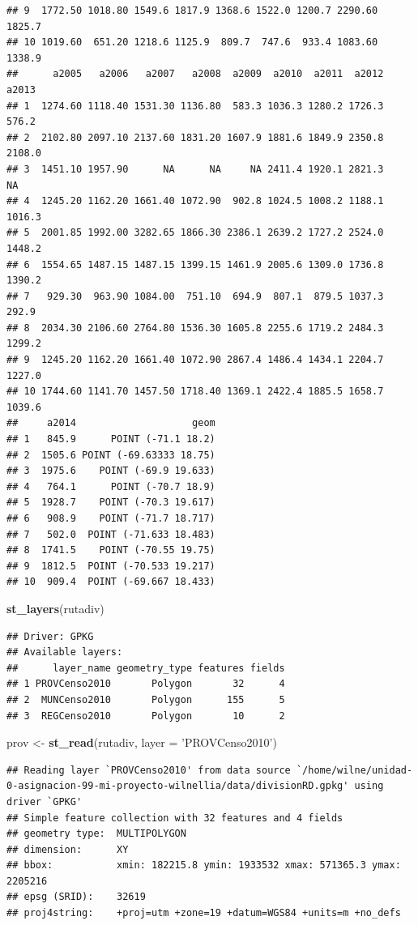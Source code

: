 \documentclass[11pt,]{article}
\newenvironment{Shaded}{\begin{snugshade}}{\end{snugshade}}
\newcommand{\KeywordTok}[1]{\textcolor[rgb]{0.13,0.29,0.53}{\textbf{#1}}}
\newcommand{\DataTypeTok}[1]{\textcolor[rgb]{0.13,0.29,0.53}{#1}}
\newcommand{\StringTok}[1]{\textcolor[rgb]{0.31,0.60,0.02}{#1}}
\newcommand{\NormalTok}[1]{#1}
\begin{document}
\begin{verbatim}
## 9  1772.50 1018.80 1549.6 1817.9 1368.6 1522.0 1200.7 2290.60 1825.7
## 10 1019.60  651.20 1218.6 1125.9  809.7  747.6  933.4 1083.60 1338.9
##      a2005   a2006   a2007   a2008  a2009  a2010  a2011  a2012  a2013
## 1  1274.60 1118.40 1531.30 1136.80  583.3 1036.3 1280.2 1726.3  576.2
## 2  2102.80 2097.10 2137.60 1831.20 1607.9 1881.6 1849.9 2350.8 2108.0
## 3  1451.10 1957.90      NA      NA     NA 2411.4 1920.1 2821.3     NA
## 4  1245.20 1162.20 1661.40 1072.90  902.8 1024.5 1008.2 1188.1 1016.3
## 5  2001.85 1992.00 3282.65 1866.30 2386.1 2639.2 1727.2 2524.0 1448.2
## 6  1554.65 1487.15 1487.15 1399.15 1461.9 2005.6 1309.0 1736.8 1390.2
## 7   929.30  963.90 1084.00  751.10  694.9  807.1  879.5 1037.3  292.9
## 8  2034.30 2106.60 2764.80 1536.30 1605.8 2255.6 1719.2 2484.3 1299.2
## 9  1245.20 1162.20 1661.40 1072.90 2867.4 1486.4 1434.1 2204.7 1227.0
## 10 1744.60 1141.70 1457.50 1718.40 1369.1 2422.4 1885.5 1658.7 1039.6
##     a2014                    geom
## 1   845.9      POINT (-71.1 18.2)
## 2  1505.6 POINT (-69.63333 18.75)
## 3  1975.6    POINT (-69.9 19.633)
## 4   764.1      POINT (-70.7 18.9)
## 5  1928.7    POINT (-70.3 19.617)
## 6   908.9    POINT (-71.7 18.717)
## 7   502.0  POINT (-71.633 18.483)
## 8  1741.5    POINT (-70.55 19.75)
## 9  1812.5  POINT (-70.533 19.217)
## 10  909.4  POINT (-69.667 18.433)
\end{verbatim}

\begin{Shaded}
\begin{Highlighting}[]
\KeywordTok{st_layers}\NormalTok{(rutadiv)}
\end{Highlighting}
\end{Shaded}

\begin{verbatim}
## Driver: GPKG 
## Available layers:
##      layer_name geometry_type features fields
## 1 PROVCenso2010       Polygon       32      4
## 2  MUNCenso2010       Polygon      155      5
## 3  REGCenso2010       Polygon       10      2
\end{verbatim}

\begin{Shaded}
\begin{Highlighting}[]
\NormalTok{prov <-}\StringTok{ }\KeywordTok{st_read}\NormalTok{(rutadiv, }\DataTypeTok{layer =} \StringTok{'PROVCenso2010'}\NormalTok{)}
\end{Highlighting}
\end{Shaded}

\begin{verbatim}
## Reading layer `PROVCenso2010' from data source `/home/wilne/unidad-0-asignacion-99-mi-proyecto-wilnellia/data/divisionRD.gpkg' using driver `GPKG'
## Simple feature collection with 32 features and 4 fields
## geometry type:  MULTIPOLYGON
## dimension:      XY
## bbox:           xmin: 182215.8 ymin: 1933532 xmax: 571365.3 ymax: 2205216
## epsg (SRID):    32619
## proj4string:    +proj=utm +zone=19 +datum=WGS84 +units=m +no_defs
\end{verbatim}
\end{document}
